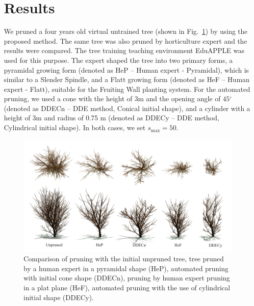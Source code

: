 
\section{Results}
We pruned a four years old virtual
untrained tree (shown in Fig.~\ref{fig:my_figure4}) by using the proposed method. The same tree was also pruned by horticulture expert and the results were compared.
The tree training teaching environment EduAPPLE \cite{kohek_eduapple:_2015} was used for
this purpose. The expert shaped the tree into two primary forms, a
pyramidal growing form (denoted as HeP -- Human expert - Pyramidal), which is similar to a Slender Spindle, and a
Flatt growing form (denoted as HeF -- Human expert - Flatt), suitable for the Fruiting Wall planting system. 
For the automated pruning, we used a cone with the height of \(3\)m and the
opening angle of \(45{^\circ}\) (denoted as DDECn -- DDE method, Conical initial shape), and a cylinder with a height of
3m and radius of 0.75 m (denoted as DDECy -- DDE method, Cylindrical initial shape). 
In both cases, we set \(s_{\mathrm{\max}}=50\). 
\begin{figure}[hbt]
    \centering
    \includegraphics[width=5.4in]{figs/Fig5.pdf}
    \caption{Comparison of pruning with the initial unpruned tree,
tree pruned by a human expert in a pyramidal shape (HeP), automated
pruning with initial cone shape (DDECn), pruning by human expert pruning
in a plat plane (HeF), automated pruning with the use of cylindrical
initial shape (DDECy).}
    \label{fig:my_figure4}
\end{figure}

